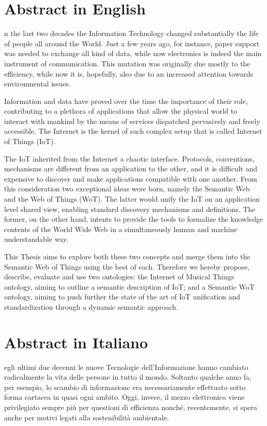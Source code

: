 \chapter*{Abstract in English}
n the last two decades the Information Technology changed substantially the life of people all around the World. Just a few years ago, for instance, paper support was needed to exchange all kind of data, while now electronics is indeed the main instrument of communication. This mutation was originally due mostly to the efficiency, while now it is, hopefully, also due to an increased attention towards environmental issues.

Information and data have proved over the time the importance of their role, contributing to a plethora of applications that allow the physical world to interact with mankind by the means of services dispatched pervasively and freely accessible. The Internet is the kernel of such complex setup that is called Internet of Things (IoT).

The IoT inherited from the Internet a chaotic interface. Protocols, conventions, mechanisms are different from an application to the other, and it is difficult and expensive to discover and make applications compatible with one another. From this consideration two exceptional ideas were born, namely the Semantic Web and the Web of Things (WoT). The latter would unify the IoT on an application level shared view, enabling standard discovery mechanisms and definitions. The former, on the other hand, intents to provide the tools to formalize the knowledge contents of the World Wide Web in a simultaneously human and machine understandable way.

This Thesis aims to explore both these two concepts and merge them into the Semantic Web of Things using the best of each. Therefore we hereby propose, describe, evaluate and use two ontologies: the Internet of Musical Things ontology, aiming to outline a semantic description of IoT; and a Semantic WoT ontology, aiming to push further the state of the art of IoT unification and standardization through a dynamic semantic approach.

\chapter*{Abstract in Italiano}
egli ultimi due decenni le nuove Tecnologie dell'Informazione hanno cambiato radicalmente la vita delle persone in tutto il mondo. Soltanto qualche anno fa, per esempio, lo scambio di informazione era necessariamente effettuato sotto forma cartacea in quasi ogni ambito. Oggi, invece, il mezzo elettronico viene privilegiato sempre più per questioni di efficienza nonch\'e, recentemente, si spera anche per motivi legati alla sostenibilità ambientale.

